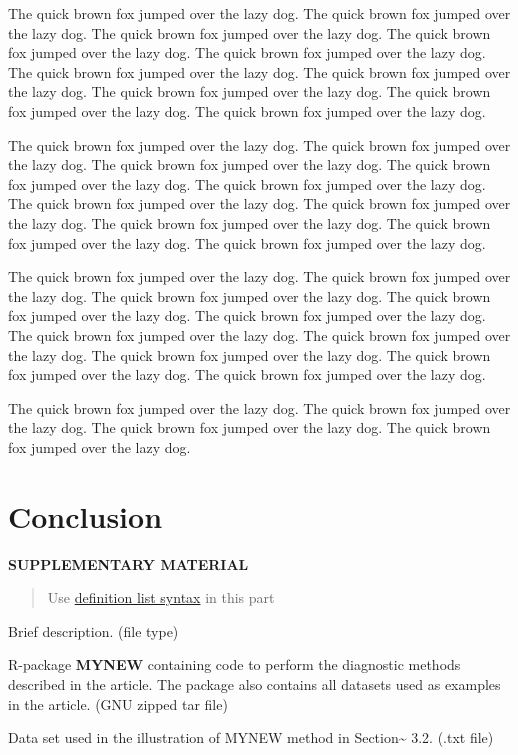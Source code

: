\documentclass[12pt]{article}
\providecommand{\tightlist}{%
  \setlength{\itemsep}{0pt}\setlength{\parskip}{0pt}}
\begin{document}
The quick brown fox jumped over the lazy dog. The quick brown fox jumped
over the lazy dog. The quick brown fox jumped over the lazy dog. The
quick brown fox jumped over the lazy dog. The quick brown fox jumped
over the lazy dog. The quick brown fox jumped over the lazy dog. The
quick brown fox jumped over the lazy dog. The quick brown fox jumped
over the lazy dog. The quick brown fox jumped over the lazy dog. The
quick brown fox jumped over the lazy dog.

The quick brown fox jumped over the lazy dog. The quick brown fox jumped
over the lazy dog. The quick brown fox jumped over the lazy dog. The
quick brown fox jumped over the lazy dog. The quick brown fox jumped
over the lazy dog. The quick brown fox jumped over the lazy dog. The
quick brown fox jumped over the lazy dog. The quick brown fox jumped
over the lazy dog. The quick brown fox jumped over the lazy dog. The
quick brown fox jumped over the lazy dog.

The quick brown fox jumped over the lazy dog. The quick brown fox jumped
over the lazy dog. The quick brown fox jumped over the lazy dog. The
quick brown fox jumped over the lazy dog. The quick brown fox jumped
over the lazy dog. The quick brown fox jumped over the lazy dog. The
quick brown fox jumped over the lazy dog. The quick brown fox jumped
over the lazy dog. The quick brown fox jumped over the lazy dog. The
quick brown fox jumped over the lazy dog.

The quick brown fox jumped over the lazy dog. The quick brown fox jumped
over the lazy dog. The quick brown fox jumped over the lazy dog. The
quick brown fox jumped over the lazy dog.

\section{Conclusion}\label{conc}

\bigskip

\begin{center}
\textbf{SUPPLEMENTARY MATERIAL}

\end{center}

\begin{quote}
Use \href{https://pandoc.org/MANUAL.html\#definition-lists}{definition
list syntax} in this part
\end{quote}

\begin{description}
\tightlist
\item[Title:]
Brief description. (file type)
\item[R-package for MYNEW routine:]
R-package \textbf{MYNEW} containing code to perform the diagnostic
methods described in the article. The package also contains all datasets
used as examples in the article. (GNU zipped tar file)
\item[HIV data set:]
Data set used in the illustration of MYNEW method in
Section\textasciitilde{} 3.2. (.txt file)
\end{description}
\end{document}
